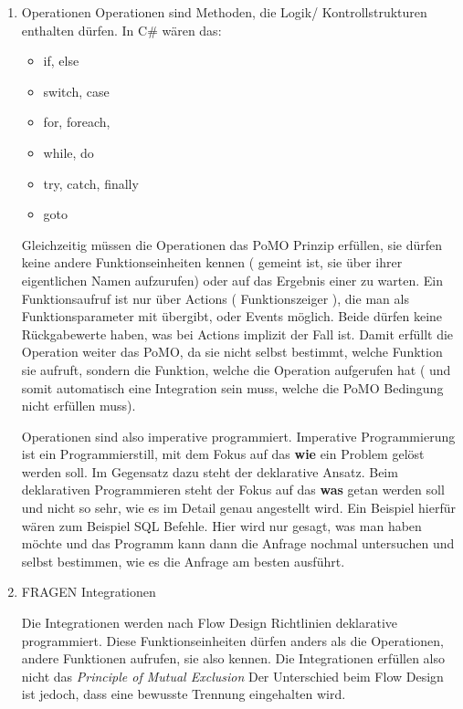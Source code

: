 \documentclass[a4paper,12pt,oneside]{book}
\begin{document}
\begin{enumerate}
\item Operationen
\label{sec-4-1-3-1}
Operationen sind Methoden, die Logik/ Kontrollstrukturen enthalten dürfen. In C\# wären das:
\begin{itemize}
\item if, else
\item switch, case
\item for, foreach,
\item while, do
\item try, catch, finally
\item goto
\end{itemize}




Gleichzeitig müssen die Operationen das PoMO Prinzip erfüllen, sie dürfen keine
andere Funktionseinheiten kennen ( gemeint ist, sie über ihrer eigentlichen
Namen aufzurufen) oder auf das Ergebnis einer zu warten.
Ein Funktionsaufruf ist nur über Actions ( Funktionszeiger ), die man als Funktionsparameter mit übergibt, oder Events möglich.
Beide dürfen keine Rückgabewerte haben, was bei Actions implizit der Fall ist.
Damit erfüllt die Operation weiter das PoMO, da sie nicht selbst bestimmt, welche Funktion sie aufruft, sondern die Funktion,
welche die Operation aufgerufen hat ( und somit automatisch eine Integration sein muss, welche die PoMO Bedingung nicht erfüllen muss).


Operationen sind also imperative programmiert. Imperative Programmierung ist ein Programmierstill,
mit dem Fokus auf das \textbf{wie} ein Problem gelöst werden soll.
Im Gegensatz dazu steht der deklarative Ansatz.
Beim deklarativen Programmieren steht der Fokus auf das \textbf{was} getan werden soll und nicht so sehr,
wie es im Detail genau angestellt wird. Ein Beispiel hierfür wären zum Beispiel SQL Befehle.
Hier wird nur gesagt, was man haben möchte und das Programm kann dann die Anfrage nochmal untersuchen
und selbst bestimmen, wie es die Anfrage am besten ausführt.

\item FRAGEN Integrationen
\label{sec-4-1-3-2}

Die Integrationen werden nach Flow Design Richtlinien deklarative programmiert.
Diese Funktionseinheiten dürfen anders als die Operationen, andere Funktionen aufrufen, sie also kennen.
Die Integrationen erfüllen also nicht das \emph{Principle of Mutual Exclusion}
Der Unterschied beim Flow Design ist jedoch, dass eine bewusste Trennung eingehalten wird.


\end{enumerate}
\end{document}
